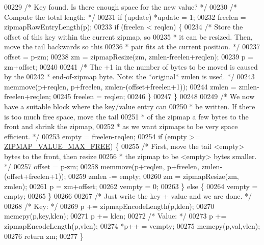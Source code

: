 \begin{DoxyCode}
00229         \textcolor{comment}{/* Key found. Is there enough space for the new value? */}
00230         \textcolor{comment}{/* Compute the total length: */}
00231         \textcolor{keywordflow}{if} (update) *update = 1;
00232         freelen = zipmapRawEntryLength(p);
00233         \textcolor{keywordflow}{if} (freelen < reqlen) \{
00234             \textcolor{comment}{/* Store the offset of this key within the current zipmap, so}
00235 \textcolor{comment}{             * it can be resized. Then, move the tail backwards so this}
00236 \textcolor{comment}{             * pair fits at the current position. */}
00237             offset = p-zm;
00238             zm = zipmapResize(zm, zmlen-freelen+reqlen);
00239             p = zm+offset;
00240 
00241             \textcolor{comment}{/* The +1 in the number of bytes to be moved is caused by the}
00242 \textcolor{comment}{             * end-of-zipmap byte. Note: the *original* zmlen is used. */}
00243             memmove(p+reqlen, p+freelen, zmlen-(offset+freelen+1));
00244             zmlen = zmlen-freelen+reqlen;
00245             freelen = reqlen;
00246         \}
00247     \}
00248 
00249     \textcolor{comment}{/* We now have a suitable block where the key/value entry can}
00250 \textcolor{comment}{     * be written. If there is too much free space, move the tail}
00251 \textcolor{comment}{     * of the zipmap a few bytes to the front and shrink the zipmap,}
00252 \textcolor{comment}{     * as we want zipmaps to be very space efficient. */}
00253     empty = freelen-reqlen;
00254     \textcolor{keywordflow}{if} (empty >= \hyperlink{zipmap_8c_a6c9247ef956b971a52b9d265083e6990}{ZIPMAP\_VALUE\_MAX\_FREE}) \{
00255         \textcolor{comment}{/* First, move the tail <empty> bytes to the front, then resize}
00256 \textcolor{comment}{         * the zipmap to be <empty> bytes smaller. */}
00257         offset = p-zm;
00258         memmove(p+reqlen, p+freelen, zmlen-(offset+freelen+1));
00259         zmlen -= empty;
00260         zm = zipmapResize(zm, zmlen);
00261         p = zm+offset;
00262         vempty = 0;
00263     \} \textcolor{keywordflow}{else} \{
00264         vempty = empty;
00265     \}
00266 
00267     \textcolor{comment}{/* Just write the key + value and we are done. */}
00268     \textcolor{comment}{/* Key: */}
00269     p += zipmapEncodeLength(p,klen);
00270     memcpy(p,key,klen);
00271     p += klen;
00272     \textcolor{comment}{/* Value: */}
00273     p += zipmapEncodeLength(p,vlen);
00274     *p++ = vempty;
00275     memcpy(p,val,vlen);
00276     \textcolor{keywordflow}{return} zm;
00277 \}

\end{DoxyCode}
